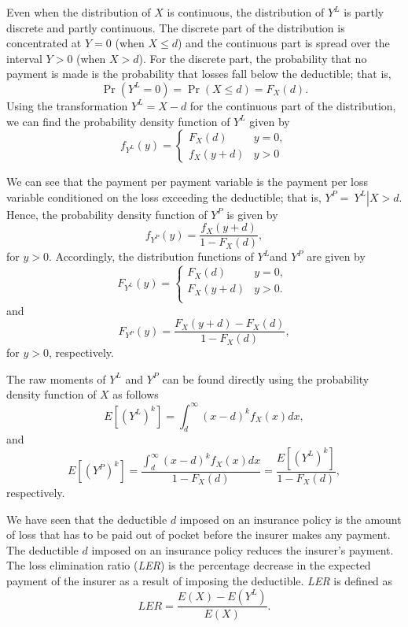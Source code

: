 \documentclass[]{book}
\theoremstyle{definition}
\theoremstyle{definition}
\theoremstyle{definition}
\theoremstyle{remark}
\begin{document}
Even when the distribution of \(X\) is continuous, the distribution of
\(Y^{L}\) is partly discrete and partly continuous. The discrete part of
the distribution is concentrated at \(Y = 0\) (when \(X \leq d\)) and
the continuous part is spread over the interval \(Y > 0\) (when
\(X > d\)). For the discrete part, the probability that no payment is
made is the probability that losses fall below the deductible; that is,
\[\Pr\left( Y^{L} = 0 \right) = \Pr\left( X \leq d \right) = F_{X}\left( d \right).\]
Using the transformation \(Y^{L} = X - d\) for the continuous part of
the distribution, we can find the probability density function of
\(Y^{L}\) given by \[f_{Y^{L}}\left( y \right) = \left\{ \begin{matrix}
F_{X}\left( d \right) & y = 0, \\
f_{X}\left( y + d \right) & y > 0 
\end{matrix} \right. \]

We can see that the payment per payment variable is the payment per loss
variable conditioned on the loss exceeding the deductible; that is,
\(Y^{P} = \left. \ Y^{L} \right|X > d\). Hence, the probability density
function of \(Y^{P}\) is given by
\[f_{Y^{P}}\left( y \right) = \frac{f_{X}\left( y + d \right)}{1 - F_{X}\left( d \right)},\]
for \(y > 0\). Accordingly, the distribution functions of \(Y^{L}\)and
\(Y^{P}\) are given by
\[F_{Y^{L}}\left( y \right) = \left\{ \begin{matrix}
F_{X}\left( d \right) & y = 0, \\
F_{X}\left( y + d \right) & y > 0. \\
\end{matrix} \right.\ \] and
\[F_{Y^{P}}\left( y \right) = \frac{F_{X}\left( y + d \right) - F_{X}\left( d \right)}{1 - F_{X}\left( d \right)},\]
for \(y > 0\), respectively.

The raw moments of \(Y^{L}\) and \(Y^{P}\) can be found directly using
the probability density function of \(X\) as follows
\[E\left\lbrack \left( Y^{L} \right)^{k} \right\rbrack = \int_{d}^{\infty}\left( x - d \right)^{k}f_{X}\left( x \right)dx ,\]
and
\[E\left\lbrack \left( Y^{P} \right)^{k} \right\rbrack = \frac{\int_{d}^{\infty}\left( x - d \right)^{k}f_{X}\left( x \right) dx }{{1 - F}_{X}\left( d \right)} = \frac{E\left\lbrack \left( Y^{L} \right)^{k} \right\rbrack}{{1 - F}_{X}\left( d \right)},\]
respectively.

We have seen that the deductible \(d\) imposed on an insurance policy is
the amount of loss that has to be paid out of pocket before the insurer
makes any payment. The deductible \(d\) imposed on an insurance policy
reduces the insurer's payment. The loss elimination ratio (\emph{LER})
is the percentage decrease in the expected payment of the insurer as a
result of imposing the deductible. \emph{LER} is defined as
\[LER = \frac{E\left( X \right) - E\left( Y^{L} \right)}{E\left( X \right)}.\]
\end{document}
